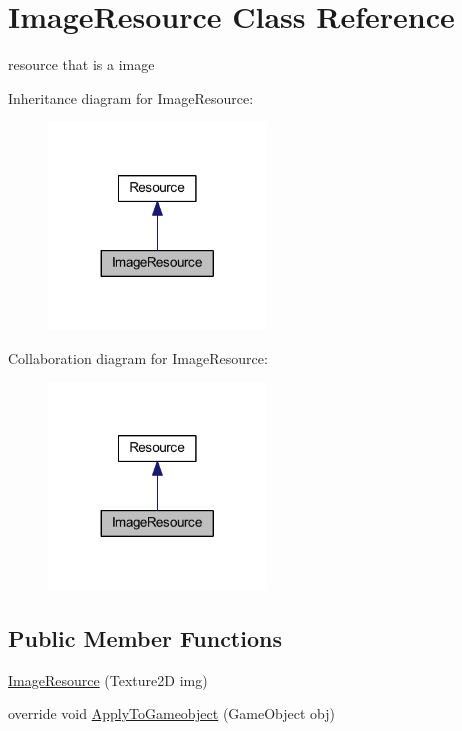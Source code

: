 \hypertarget{class_image_resource}{}\section{Image\+Resource Class Reference}
\label{class_image_resource}


resource that is a image  




Inheritance diagram for Image\+Resource\+:
\nopagebreak
\begin{figure}[H]
\begin{center}
\leavevmode
\includegraphics[width=164pt]{class_image_resource__inherit__graph}
\end{center}
\end{figure}


Collaboration diagram for Image\+Resource\+:
\nopagebreak
\begin{figure}[H]
\begin{center}
\leavevmode
\includegraphics[width=164pt]{class_image_resource__coll__graph}
\end{center}
\end{figure}
\subsection*{Public Member Functions}
\begin{DoxyCompactItemize}
\item 
\mbox{\hyperlink{class_image_resource_a2c520197f5e544579eab32d23167b317}{Image\+Resource}} (Texture2D img)
\item 
override void \mbox{\hyperlink{class_image_resource_a98a60534e3c84e19caaf327732126d00}{Apply\+To\+Gameobject}} (Game\+Object obj)
\end{DoxyCompactItemize}
